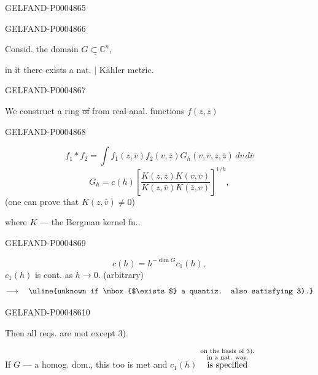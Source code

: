 \begin{GelfandAdjacentEvidence}{GELFAND-P000486}{5}

\end{GelfandAdjacentEvidence}
\begin{GelfandAdjacentEvidence}{GELFAND-P000486}{6}


Consid. the domain $\underline{G\subset\mathbb C^n}$,

in it there exists a nat. $\vert$ Kähler metric.
\end{GelfandAdjacentEvidence}
\begin{GelfandAdjacentEvidence}{GELFAND-P000486}{7}


We construct a ring \sout{of} from real-anal. functions $f(z,\bar z)$
\end{GelfandAdjacentEvidence}
\begin{GelfandAdjacentEvidence}{GELFAND-P000486}{8}

\[
f_1*f_2=\int f_1(z,\bar v)f_2(v,\bar z)G_h(v,\bar v,z,\bar z)\,dv\,d\bar v
\]
\[
G_h=c(h)\left[\frac{K(z,\bar z)K(v,\bar v)}{K(z,\bar v)K(\bar z,v)}\right]^{1/h},
\]
(one can prove that $K(z,\bar v)\ne0$)

where $K$ — the Bergman kernel fn..
\end{GelfandAdjacentEvidence}
\begin{GelfandAdjacentEvidence}{GELFAND-P000486}{9}


\[
c(h)=h^{-\dim G}c_1(h),
\]
$c_1(h)$ is cont. as $h\to0$. (arbitrary)
\[
\longrightarrow\quad\text{\uline{unknown if \mbox{$\exists$} a quantiz. also satisfying 3).}}
\]
\end{GelfandAdjacentEvidence}
\begin{GelfandAdjacentEvidence}{GELFAND-P000486}{10}


Then all reqs. are met except 3).

If $G$ — a homog. dom., this too is met and $c_1(h)$
$\overset{\substack{\text{\scriptsize on the basis of 3).}\\
                   \text{\scriptsize in a nat. way.}}}{\text{is specified}}$
\end{GelfandAdjacentEvidence}
